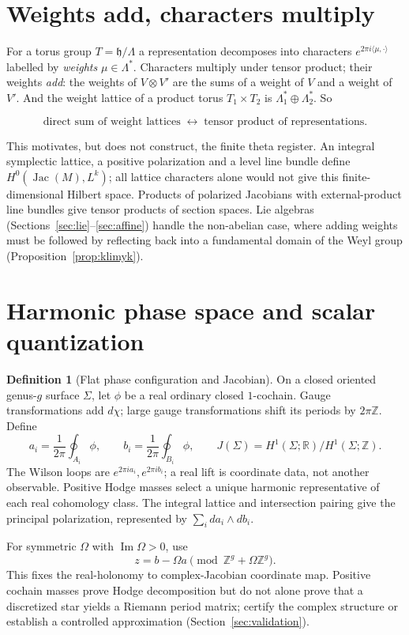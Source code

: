 \documentclass[11pt]{article}
\theoremstyle{definition}
\newtheorem{definition}[theorem]{Definition}
\theoremstyle{remark}
\newcommand{\Z}{\mathbb{Z}}
\newcommand{\R}{\mathbb{R}}
\begin{document}
\section{Weights add, characters multiply}\label{sec:weights}

For a torus group $T = \mathfrak h/\Lambda$ a representation decomposes into
characters $e^{2\pi i\langle\mu,\cdot\rangle}$ labelled by \emph{weights}
$\mu \in \Lambda^*$. Characters multiply under tensor product; their weights
\emph{add}: the weights of $V\otimes V'$ are the sums of a weight of $V$ and a
weight of $V'$. And the weight lattice of a product torus $T_1 \times T_2$
is $\Lambda_1^* \oplus \Lambda_2^*$. So

\[
  \text{direct sum of weight lattices} \;\longleftrightarrow\;
  \text{tensor product of representations}.
\]

This motivates, but does not construct, the finite theta register.
An integral symplectic lattice, a positive polarization and a level line
bundle define $H^0(\operatorname{Jac}(M),L^k)$; all lattice characters alone
would not give this finite-dimensional Hilbert space. Products of polarized
Jacobians with external-product line bundles give tensor products of section
spaces. Lie algebras (Sections~\ref{sec:lie}--\ref{sec:affine}) handle the
non-abelian case, where adding weights must be followed by reflecting back
into a fundamental domain of the Weyl group (Proposition~\ref{prop:klimyk}).

\section{Harmonic phase space and scalar quantization}\label{sec:phase-space}

\begin{definition}[Flat phase configuration and Jacobian]
On a closed oriented genus-$g$ surface $\Sigma$, let $\phi$ be a real
ordinary closed $1$-cochain. Gauge transformations add $d\chi$; large gauge
transformations shift its periods by $2\pi\Z$. Define
\[
 a_i=\frac1{2\pi}\oint_{A_i}\phi,\qquad
 b_i=\frac1{2\pi}\oint_{B_i}\phi,\qquad
 J(\Sigma)=H^1(\Sigma;\R)/H^1(\Sigma;\Z).
\]
The Wilson loops are $e^{2\pi i a_i},e^{2\pi i b_i}$; a real lift is
coordinate data, not another observable. Positive Hodge masses select a
unique harmonic representative of each real cohomology class. The
integral lattice and intersection pairing give the principal polarization,
represented by $\sum_i da_i\wedge db_i$.
\end{definition}
For symmetric $\Omega$ with $\operatorname{Im}\Omega>0$, use
\[
 z=b-\Omega a\pmod{\Z^g+\Omega\Z^g}.
\]
This fixes the real-holonomy to complex-Jacobian coordinate map. Positive
cochain masses prove Hodge decomposition but do not alone prove that a
discretized star yields a Riemann period matrix; certify the complex
structure or establish a controlled approximation
(Section~\ref{sec:validation}).
\end{document}
